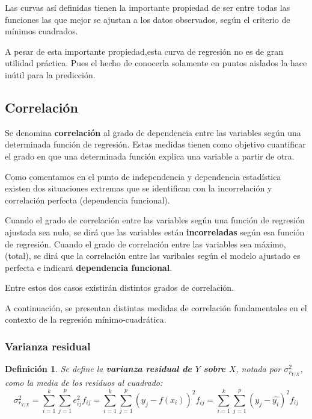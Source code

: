 \documentclass[10pt, a4paper]{article}
\theoremstyle{theorem-style}
\theoremstyle{definition-style}
\newtheorem{ndef}{Definición}[section]
\theoremstyle{remark-style}
\theoremstyle{example-style}
\theoremstyle{definition-style}
\theoremstyle{remark-style}
\begin{document}
Las curvas así definidas tienen la importante propiedad de ser entre todas las
funciones las que mejor se ajustan a los datos observados, según el criterio de
mínimos cuadrados.

A pesar de esta importante propiedad,esta curva de regresión no es de gran
utilidad práctica. Pues el hecho de conocerla solamente en puntos aislados la
hace inútil para la predicción.
	
\pagebreak

\subsection{Correlación}

Se denomina \textbf{correlación} al grado de dependencia entre las variables según una
determinada función de regresión. Estas medidas tienen como objetivo cuantificar
el grado en que una determinada función explica una variable a partir de otra.

Como comentamos en el punto de independencia y dependencia estadística existen
dos situaciones extremas que se identifican con la incorrelación y correlación
perfecta (dependencia funcional).

Cuando el grado de correlación entre las variables según una función de
regresión ajustada sea nulo, se dirá que las variables están \textbf{incorreladas}
según esa función de regresión. Cuando el grado de correlación entre las
variables sea máximo, (total), se dirá que la correlación entre las varibales
según el modelo ajustado es perfecta e indicará \textbf{dependencia funcional}.

Entre estos dos casos existirán distintos grados de correlación.

A continuación, se presentan distintas medidas de correlación fundamentales en el
contexto de la regresión mínimo-cuadrática.

\subsubsection{Varianza residual}
\begin{ndef}
	Se define la \textbf{varianza residual de $Y$ sobre $X$}, notada por $\sigma_{r_{Y/X}}^2 $, como la media de los residuos al cuadrado:
$$
\sigma_{r_{Y/X}}^2 =
	\sum_{i=1}^k \sum_{j=1}^p e_{ij}^2 f_{ij} =
	\sum_{i=1}^k \sum_{j=1}^p {(y_j - f(x_i))}^2 f_{ij} =
	\sum_{i=1}^k \sum_{j=1}^p {(y_j -\hat{y_i})}^2 f_{ij}
$$
\end{ndef}
\end{document}
